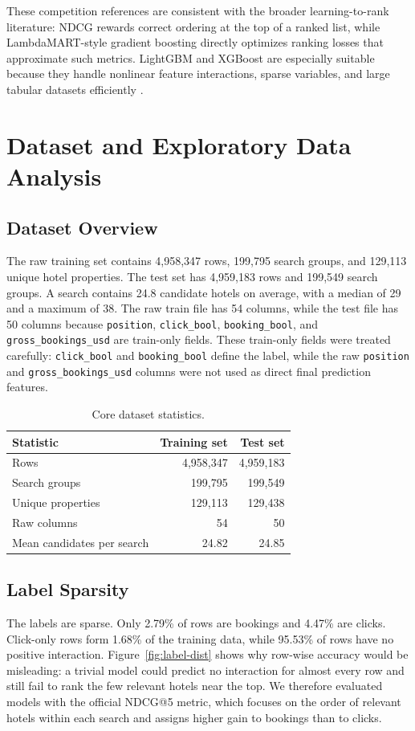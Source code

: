 \documentclass[runningheads]{llncs}
\begin{document}
These competition references are consistent with the broader learning-to-rank literature: NDCG rewards correct ordering at the top of a ranked list, while LambdaMART-style gradient boosting directly optimizes ranking losses that approximate such metrics.  LightGBM and XGBoost are especially suitable because they handle nonlinear feature interactions, sparse variables, and large tabular datasets efficiently \cite{burges2010ranknet,ke2017lightgbm,chen2016xgboost}.

\section{Dataset and Exploratory Data Analysis}

\subsection{Dataset Overview}

The raw training set contains 4,958,347 rows, 199,795 search groups, and 129,113 unique hotel properties.  The test set has 4,959,183 rows and 199,549 search groups.  A search contains 24.8 candidate hotels on average, with a median of 29 and a maximum of 38.  The raw train file has 54 columns, while the test file has 50 columns because \texttt{position}, \texttt{click\_bool}, \texttt{booking\_bool}, and \texttt{gross\_bookings\_usd} are train-only fields.  These train-only fields were treated carefully: \texttt{click\_bool} and \texttt{booking\_bool} define the label, while the raw \texttt{position} and \texttt{gross\_bookings\_usd} columns were not used as direct final prediction features.

\begin{table}[t]
\centering
\caption{Core dataset statistics.}
\label{tab:dataset}
\begin{tabular}{lrr}
\toprule
Statistic & Training set & Test set \\
\midrule
Rows & 4,958,347 & 4,959,183 \\
Search groups & 199,795 & 199,549 \\
Unique properties & 129,113 & 129,438 \\
Raw columns & 54 & 50 \\
Mean candidates per search & 24.82 & 24.85 \\
\bottomrule
\end{tabular}
\end{table}

\subsection{Label Sparsity}
The labels are sparse.  Only 2.79\% of rows are bookings and 4.47\% are clicks.  Click-only rows form 1.68\% of the training data, while 95.53\% of rows have no positive interaction.  Figure~\ref{fig:label-dist} shows why row-wise accuracy would be misleading: a trivial model could predict no interaction for almost every row and still fail to rank the few relevant hotels near the top.  We therefore evaluated models with the official NDCG@5 metric, which focuses on the order of relevant hotels within each search and assigns higher gain to bookings than to clicks.
\end{document}
